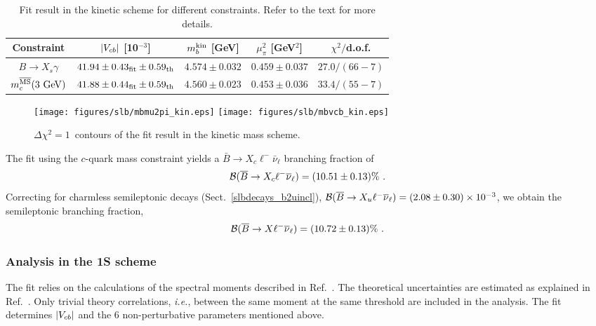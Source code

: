 \begin{table}[!htb]
\caption{Fit result in the kinetic scheme for different
  constraints. Refer to the text for more
  details.} \label{tab:gf_res_kin}
\begin{center}
\begin{tabular}{|c|c|c|c|c|}
  \hline
  Constraint & $|V_{cb}|$ [10$^{-3}$] & $m_b^{\rm kin}$ [GeV] &
  $\mu^2_\pi$ [GeV$^2$] & $\chi^2/$d.o.f.\\
  \hline \hline
  $B\to X_s\gamma$ & $41.94\pm 0.43_{\rm fit}\pm 0.59_{\rm th}$ &
  $4.574\pm 0.032$ & $0.459\pm 0.037$ & $27.0/(66-7)$\\
  $m_c^{\overline{\rm MS}}(3~{\rm GeV})$ & $41.88\pm 0.44_{\rm fit}\pm
  0.59_{\rm th}$ & $4.560\pm 0.023$ & $0.453\pm 0.036$ &
  $33.4/(55-7)$\\
  \hline
\end{tabular}
\end{center}
\end{table}
\begin{figure}
\begin{center}
  \texttt{[image: figures/slb/mbmu2pi\_kin.eps]}
  \texttt{[image: figures/slb/mbvcb\_kin.eps]}
\end{center}
\caption{$\Delta\chi^2=1$~contours of the fit result in the kinetic mass
  scheme.} \label{fig:gf_res_kin}
\end{figure}

The fit using the $c$-quark mass constraint yields a $\bar B\to
X_c\ell^-\bar\nu_\ell$ branching fraction of
\begin{equation}
  \cbf(\bar B\to X_c\ell^-\bar\nu_\ell)=(10.51\pm 0.13)\%~.
\end{equation}
Correcting for charmless semileptonic decays
(Sect.~\ref{slbdecays_b2uincl}), $\cbf(\bar B\to
X_u\ell^-\bar\nu_\ell)=(2.08\pm 0.30)\times 10^{-3}$, we obtain the
semileptonic branching fraction,
\begin{equation}
  \cbf(\bar B\to X\ell^-\bar\nu_\ell)=(10.72\pm 0.13)\%~.
\end{equation}

\subsubsection{Analysis in the 1S scheme}
\label{globalfits1S}

The fit relies on the calculations of the spectral moments described in
Ref.~\cite{Bauer:2004ve}. The theoretical uncertainties are estimated
as explained in Ref.~\cite{Schwanda:2008kw}. Only trivial theory
correlations, {\it i.e.}, between the same moment at the same
threshold are included in the analysis. The fit determines $|V_{cb}|$ and
the 6 non-perturbative parameters mentioned above.

